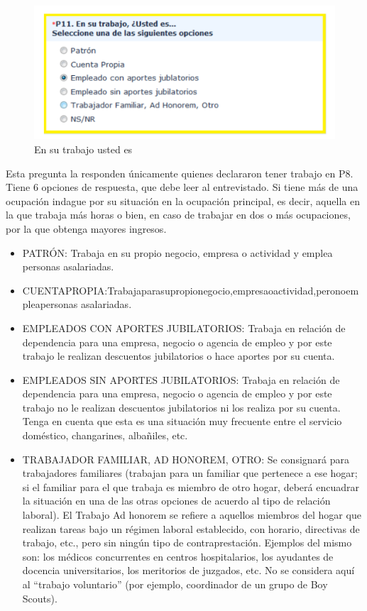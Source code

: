 \documentclass[
  openany]{book}
\begin{document}
\begin{figure}

{\centering \includegraphics[width=1\linewidth]{imagenes/figura6-58} 

}

\caption{En su trabajo usted es}\label{fig:soy}
\end{figure}

Esta pregunta la responden únicamente quienes declararon tener trabajo en P8. Tiene 6 opciones de respuesta, que debe leer al entrevistado. Si tiene más de una ocupación indague por su situación en la ocupación principal, es decir, aquella en la que trabaja más horas o bien, en caso de trabajar en dos o más ocupaciones, por la que obtenga mayores ingresos.

\begin{itemize}
\item
  PATRÓN: Trabaja en su propio negocio, empresa o actividad y emplea personas asalariadas.
\item
  CUENTAPROPIA:Trabajaparasupropionegocio,empresaoactividad,peronoempleapersonas asalariadas.
\item
  EMPLEADOS CON APORTES JUBILATORIOS: Trabaja en relación de dependencia para una empresa, negocio o agencia de empleo y por este trabajo le realizan descuentos jubilatorios o hace aportes por su cuenta.
\item
  EMPLEADOS SIN APORTES JUBILATORIOS: Trabaja en relación de dependencia para una empresa, negocio o agencia de empleo y por este trabajo no le realizan descuentos jubilatorios ni los realiza por su cuenta. Tenga en cuenta que esta es una situación muy frecuente entre el servicio doméstico, changarines, albañiles, etc.
\item
  TRABAJADOR FAMILIAR, AD HONOREM, OTRO: Se consignará para trabajadores familiares (trabajan para un familiar que pertenece a ese hogar; si el familiar para el que trabaja es miembro de otro hogar, deberá encuadrar la situación en una de las otras opciones de acuerdo al tipo de relación laboral). El Trabajo Ad honorem se refiere a aquellos miembros del hogar que realizan tareas bajo un régimen laboral establecido, con horario, directivas de trabajo, etc., pero sin ningún tipo de contraprestación. Ejemplos del mismo son: los médicos concurrentes en centros hospitalarios, los ayudantes de docencia universitarios, los meritorios de juzgados, etc. No se considera aquí al ``trabajo voluntario'' (por ejemplo, coordinador de un grupo de Boy Scouts).
\end{itemize}
\end{document}
